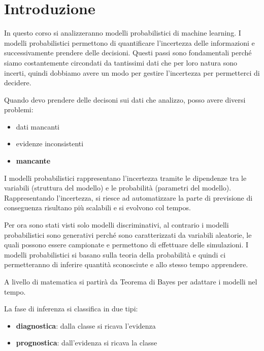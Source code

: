\chapter{Introduzione}
In questo corso si analizzeranno modelli probabilistici di machine learning. 
I modelli probabilistici permettono di quantificare l'incertezza delle informazioni 
e successivamente prendere delle decisioni. Questi passi sono fondamentali perché
siamo costantemente circondati da tantissimi dati che per loro natura sono incerti, 
quindi dobbiamo avere un modo per gestire l'incertezza per permetterci di decidere.

Quando devo prendere delle decisoni sui dati che analizzo, posso avere diversi problemi:
\begin{itemize}
    \item dati mancanti
    \item evidenze inconsistenti
    \item \textbf{mancante}
\end{itemize}

I modelli probabilistici rappresentano l'incertezza tramite le dipendenze tra le 
variabili (struttura del modello) e le probabilità (parametri del modello). Rappresentando 
l'incertezza, si riesce ad automatizzare la parte di previsione di conseguenza
risultano più scalabili e si evolvono col tempos.

Per ora sono stati visti solo modelli discriminativi, al contrario i modelli probabilistici
sono generativi perché sono caratterizzati da variabili aleatorie, le quali possono 
essere campionate e permettono di effettuare delle simulazioni. 
I modelli probabilistici si basano sulla teoria della probabilità e quindi ci permetteranno
di inferire quantità sconosciute e allo stesso tempo apprendere.

A livello di matematica si partirà da Teorema di Bayes per adattare i modelli 
nel tempo.

La fase di inferenza si classifica in due tipi:
\begin{itemize}
    \item \textbf{diagnostica}: dalla classe si ricava l'evidenza
    \item \textbf{prognostica}: dall'evidenza si ricava la classe
\end{itemize}

